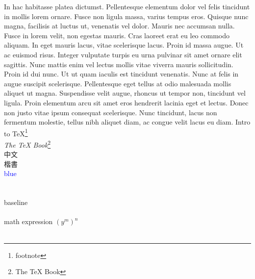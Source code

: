 In hac habitasse platea dictumst. Pellentesque elementum dolor vel felis tincidunt in mollis lorem ornare. Fusce non
ligula massa, varius tempus eros. Quisque nunc magna, facilisis at luctus ut, venenatis vel dolor. Mauris nec accumsan
nulla. Fusce in lorem velit, non egestas mauris. Cras laoreet erat eu leo commodo aliquam. In eget mauris lacus, vitae
scelerisque lacus. Proin id massa augue. Ut ac euismod risus. Integer vulputate turpis eu urna pulvinar sit amet ornare
elit sagittis. Nunc mattis enim vel lectus mollis vitae viverra mauris sollicitudin. Proin id dui nunc. Ut ut quam
iaculis est tincidunt venenatis. Nunc at felis in augue suscipit scelerisque. Pellentesque eget tellus at odio malesuada
mollis aliquet ut magna. Suspendisse velit augue, rhoncus ut tempor non, tincidunt vel ligula. Proin elementum arcu sit
amet eros hendrerit lacinia eget et lectus. Donec non justo vitae ipsum consequat scelerisque. Nunc tincidunt, lacus non
fermentum molestie, tellus nibh aliquet diam, ac congue velit lacus eu diam.
Intro to \TeX\footnote{footnote}\\
\textit{The TeX Book}\footnote{The TeX Book}\\
\msjh 中文\rmfamily \\
\kai 楷書\rmfamily \\
\textcolor{blue}{blue}\\
\\ \\
baseline \raisebox{1ex}{upward}\raisebox{-1ex}{downward}\\\\
math expression $ (y^m)^n $ \\\\


